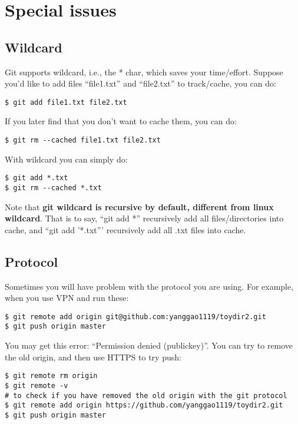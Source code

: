 \documentclass{article} %
\newcommand{\q}[1]{``#1''}
\begin{document}
\section{Special issues}

\subsection{Wildcard}

Git supports wildcard, i.e., the * char, which saves your time/effort. Suppose you'd like to add files \q{file1.txt} and \q{file2.txt} to track/cache, you can do:

\begin{lstlisting}
$ git add file1.txt file2.txt
\end{lstlisting}

If you later find that you don't want to cache them, you can do:

\begin{lstlisting}
$ git rm --cached file1.txt file2.txt
\end{lstlisting}

With wildcard you can simply do:

\begin{lstlisting}
$ git add *.txt
$ git rm --cached *.txt
\end{lstlisting}

Note that \textbf{git wildcard is recursive by default, different from linux wildcard}. That is to say, \q{git add *} recursively add all files/directories into cache, and \q{git add '*.txt'} recursively add all .txt files into cache.

\subsection{Protocol}

Sometimes you will have problem with the protocol you are using. For example, when you use VPN and run these:

\begin{lstlisting}
$ git remote add origin git@github.com:yanggao1119/toydir2.git
$ git push origin master
\end{lstlisting}

You may get this error: \q{Permission denied (publickey)}. You can try to remove the old origin, and then use HTTPS to try push:

\begin{lstlisting}
$ git remote rm origin
$ git remote -v 
# to check if you have removed the old origin with the git protocol
$ git remote add origin https://github.com/yanggao1119/toydir2.git
$ git push origin master  
\end{lstlisting}
\end{document}
